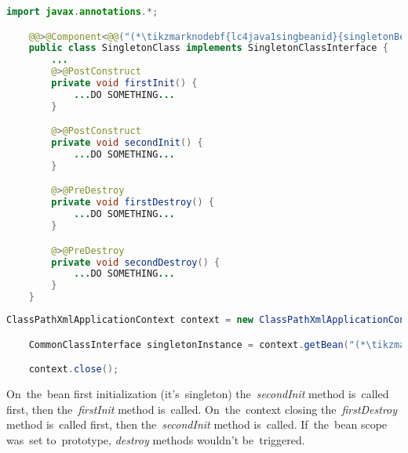 \example
\begin{lstlisting}[language=Java, title={Singleton bean class with multiple life cycle methods}]
    import javax.annotations.*;

    @@>@Component<@@("(*\tikzmarknodebf{lc4java1singbeanid}{singletonBeanId}[ForestGreen]*)")
    public class SingletonClass implements SingletonClassInterface {
        ...
        @>@PostConstruct
        private void firstInit() {
            ...DO SOMETHING...
        }

        @>@PostConstruct
        private void secondInit() {
            ...DO SOMETHING...
        }

        @>@PreDestroy
        private void firstDestroy() {
            ...DO SOMETHING...
        }

        @>@PreDestroy
        private void secondDestroy() {
            ...DO SOMETHING...
        }
    }
\end{lstlisting}
\begin{lstlisting}[language=Java, title={Usage}]
    ClassPathXmlApplicationContext context = new ClassPathXmlApplicationContext("configurationFile.xml");

    CommonClassInterface singletonInstance = context.getBean("(*\tikzmarknodebf{lc4java2singbeanid}{singletonBeanId}[ForestGreen]*)", SingletonClassInterface.class);

    context.close();
\end{lstlisting}

\noindent On~the~bean first initialization (it's~singleton) the~\textit{secondInit} method is~called first, then the~\textit{firstInit} method is~called. On~the~context closing the~\textit{firstDestroy} method is~called first, then the~\textit{secondInit} method is~called. If~the~bean scope was~set to~prototype, \textit{destroy} methods wouldn't be~triggered.